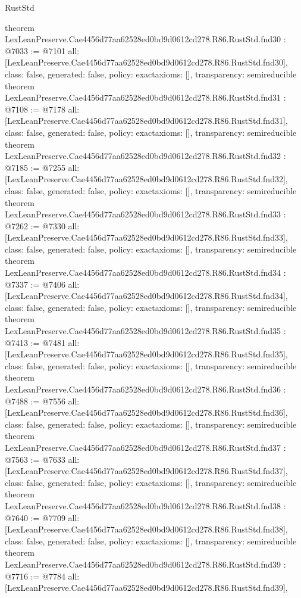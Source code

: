 \begin{lexlean}{RustStd}
\begin{coremodule}
{}
theorem LexLeanPreserve.Cae4456d77aa62528ed0bd9d0612cd278.R86.RustStd.fnd30 : @7033 := @7101 {
  all: [LexLeanPreserve.Cae4456d77aa62528ed0bd9d0612cd278.R86.RustStd.fnd30],
  class: false,
  generated: false,
  policy: exact{axioms: []},
  transparency: semireducible
}
theorem LexLeanPreserve.Cae4456d77aa62528ed0bd9d0612cd278.R86.RustStd.fnd31 : @7108 := @7178 {
  all: [LexLeanPreserve.Cae4456d77aa62528ed0bd9d0612cd278.R86.RustStd.fnd31],
  class: false,
  generated: false,
  policy: exact{axioms: []},
  transparency: semireducible
}
theorem LexLeanPreserve.Cae4456d77aa62528ed0bd9d0612cd278.R86.RustStd.fnd32 : @7185 := @7255 {
  all: [LexLeanPreserve.Cae4456d77aa62528ed0bd9d0612cd278.R86.RustStd.fnd32],
  class: false,
  generated: false,
  policy: exact{axioms: []},
  transparency: semireducible
}
theorem LexLeanPreserve.Cae4456d77aa62528ed0bd9d0612cd278.R86.RustStd.fnd33 : @7262 := @7330 {
  all: [LexLeanPreserve.Cae4456d77aa62528ed0bd9d0612cd278.R86.RustStd.fnd33],
  class: false,
  generated: false,
  policy: exact{axioms: []},
  transparency: semireducible
}
theorem LexLeanPreserve.Cae4456d77aa62528ed0bd9d0612cd278.R86.RustStd.fnd34 : @7337 := @7406 {
  all: [LexLeanPreserve.Cae4456d77aa62528ed0bd9d0612cd278.R86.RustStd.fnd34],
  class: false,
  generated: false,
  policy: exact{axioms: []},
  transparency: semireducible
}
theorem LexLeanPreserve.Cae4456d77aa62528ed0bd9d0612cd278.R86.RustStd.fnd35 : @7413 := @7481 {
  all: [LexLeanPreserve.Cae4456d77aa62528ed0bd9d0612cd278.R86.RustStd.fnd35],
  class: false,
  generated: false,
  policy: exact{axioms: []},
  transparency: semireducible
}
theorem LexLeanPreserve.Cae4456d77aa62528ed0bd9d0612cd278.R86.RustStd.fnd36 : @7488 := @7556 {
  all: [LexLeanPreserve.Cae4456d77aa62528ed0bd9d0612cd278.R86.RustStd.fnd36],
  class: false,
  generated: false,
  policy: exact{axioms: []},
  transparency: semireducible
}
theorem LexLeanPreserve.Cae4456d77aa62528ed0bd9d0612cd278.R86.RustStd.fnd37 : @7563 := @7633 {
  all: [LexLeanPreserve.Cae4456d77aa62528ed0bd9d0612cd278.R86.RustStd.fnd37],
  class: false,
  generated: false,
  policy: exact{axioms: []},
  transparency: semireducible
}
theorem LexLeanPreserve.Cae4456d77aa62528ed0bd9d0612cd278.R86.RustStd.fnd38 : @7640 := @7709 {
  all: [LexLeanPreserve.Cae4456d77aa62528ed0bd9d0612cd278.R86.RustStd.fnd38],
  class: false,
  generated: false,
  policy: exact{axioms: []},
  transparency: semireducible
}
theorem LexLeanPreserve.Cae4456d77aa62528ed0bd9d0612cd278.R86.RustStd.fnd39 : @7716 := @7784 {
  all: [LexLeanPreserve.Cae4456d77aa62528ed0bd9d0612cd278.R86.RustStd.fnd39],
}
\end{coremodule}
\end{lexlean}
